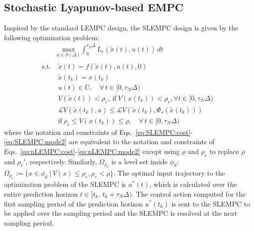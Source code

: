 \documentclass[letterpaper, 10pt, conference]{ieeeconf}
\begin{document}
	\subsection{Stochastic Lyapunov-based EMPC}
	Inspired by the standard LEMPC design, the SLEMPC design is given by the following optimization problem:
	\begin{subequations}
		\label{eq:SLEMPC}
		\begin{align}
		&\underset{u \in S(\Delta)}{\text{max}}  \int_{0}^{\tau_{N} \Delta} L_e( \tilde{x}(t), u(t)) \, dt \label{eq:SLEMPC:cost} \\
		\text{s.t.} & ~\dot{\tilde{x}}(t) = f(\tilde{x}(t), u(t),0) \label{eq:SLEMPC:model} \\
		& ~ \tilde{x}(t_k) = x(t_k) \label{eq:SLEMPC:state} \\
		&~u(t) \in U, \quad \forall \, t \in [0, \tau_{N} \Delta) \label{eq:SLEMPC:input} \\
		&~ V(\tilde{x}(t)) < \rho_e,~ \mbox{if}~V(x(t_k)) < \rho_e, \forall t \in [0, \tau_{N} \Delta) \label{eq:SLEMPC:mode1}\\
		&~\mathcal{L}V(\tilde{x}(t_k),u) \leq \mathcal{L}V(\tilde{x}(t_k),\Phi_s(\tilde{x}(t_k))) \nonumber\\
		&~ \mbox{if}~ \rho_e \leq V(x(t_k)) \leq  \rho, \quad \forall \, t \in [0, \tau_{N} \Delta) \label{eq:SLEMPC:mode2}
		\end{align}
	\end{subequations}
where the notation and constraints of Eqs.~\ref{eq:SLEMPC:cost}-\ref{eq:SLEMPC:mode2} are equivalent to the notation and constraints of Eqs.~\ref{eq:nLEMPC:cost}-\ref{eq:nLEMPC:mode2} except using $\rho$ and $\rho_e$ to replace $\rho$ and $\rho_e'$, respectively. Similarly, $\Omega_{\rho_e}$ is a level set inside $\phi_{d}$: $\Omega_{\rho_e} :=\{ x \in \phi_d ~|~ V(x) \leq \rho_e, \rho_e <\rho \}$. The optimal input trajectory to the optimization problem of the SLEMPC is $u^*(t)$, which is calculated over the entire prediction horizon $t \in [t_k, \, t_k + \tau_{N} \Delta)$. The control action computed for the first sampling period of the prediction horizon $u^*(t_k)$ is sent to the SLEMPC to be applied over the sampling period and the SLEMPC is resolved at the next sampling period.
	
\end{document}
